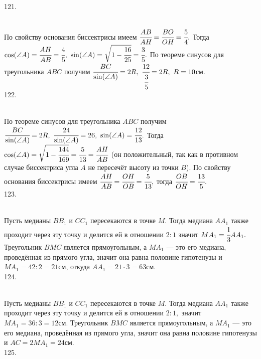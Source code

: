 121. \begin{figure}[ht!]
\end{figure}\\
По свойству основания биссектрисы имеем $\cfrac{AB}{AH}=\cfrac{BO}{OH}=\cfrac{5}{4}.$ Тогда $\cos(\angle A)=\cfrac{AH}{AB}=\cfrac{4}{5},\ \sin(\angle A)=\sqrt{1-\cfrac{16}{25}}=\cfrac{3}{5}.$ По теореме синусов для треугольника $ABC$ получим $\cfrac{BC}{\sin(\angle A)}=2R,\ \cfrac{12}{\cfrac{3}{5}}=2R,\ R=10$см.\\
122. \begin{figure}[ht!]
\end{figure}\\
По теореме синусов для треугольника $ABC$ получим $\cfrac{BC}{\sin(\angle A)}=2R,\ \cfrac{24}{\sin(\angle A)}=26,\ \sin(\angle A)=\cfrac{12}{13}.$
Тогда $\cos(\angle A)=\sqrt{1-\cfrac{144}{169}}=\cfrac{5}{13}=\cfrac{AH}{AB}$ (он положительный, так как в противном случае биссектриса угла $A$ не пересечёт высоту из точки $B$). По свойству основания биссектрисы имеем $\cfrac{AH}{AB}=\cfrac{OH}{OB}=\cfrac{5}{13},$ тогда $\cfrac{OB}{OH}=\cfrac{13}{5}.$\\
123. \begin{figure}[ht!]
\end{figure}\\
Пусть медианы $BB_1$ и $CC_1$ пересекаются в точке $M.$ Тогда медиана $AA_1$ также проходит через эту точку и делится ей в отношении $2:1$ значит $MA_1=\cfrac{1}{3}AA_1.$ Треугольник $BMC$ является прямоугольным, а $MA_1$ --- это его медиана, проведённая из прямого угла, значит она равна половине гипотенузы и $MA_1=42:2=21$см, откуда $AA_1=21\cdot3=63$см.\\
124. \begin{figure}[ht!]
\end{figure}\\
Пусть медианы $BB_1$ и $CC_1$ пересекаются в точке $M.$ Тогда медиана $AA_1$ также проходит через эту точку и делится ей в отношении $2:1,$ значит $MA_1=36:3=12$см. Треугольник $BMC$ является прямоугольным, а $MA_1$ --- это его медиана, проведённая из прямого угла, значит она равна половине гипотенузы и $AC=2MA_1=24$см.\\
125. \begin{figure}[ht!]
\end{figure}\\
